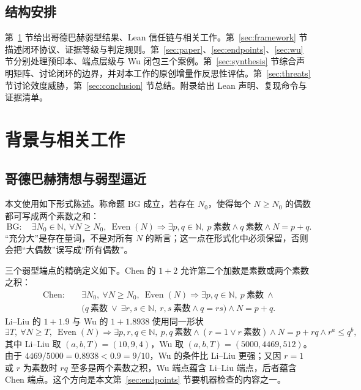 \documentclass[11pt,a4paper]{ctexart}
\theoremstyle{plain}
\theoremstyle{definition}
\newcommand{\BG}{\mathrm{BG}}
\newcommand{\Chen}{\mathrm{Chen}}
\newcommand{\Even}{\operatorname{Even}}
\newcommand{\N}{\mathbb{N}}
\begin{document}
\subsection{结构安排}
\label{sec:organization}

第~\ref{sec:background} 节给出哥德巴赫弱型结果、Lean 信任链与相关工作。第~\ref{sec:framework} 节描述闭环协议、证据等级与判定规则。第~\ref{sec:paper}、\ref{sec:endpoints}、\ref{sec:wu} 节分别处理预印本、端点层级与 Wu 闭包三个案例。第~\ref{sec:synthesis} 节综合声明矩阵、讨论闭环的边界，并对本工作的原创增量作反思性评估。第~\ref{sec:threats} 节讨论效度威胁，第~\ref{sec:conclusion} 节总结。附录给出 Lean 声明、复现命令与证据清单。

\section{背景与相关工作}
\label{sec:background}

\subsection{哥德巴赫猜想与弱型逼近}
\label{sec:bg}

本文使用如下形式陈述。称命题 $\BG$ 成立，若存在 $N_0$，使得每个 $N\ge N_0$ 的偶数都可写成两个素数之和：
\begin{equation}
\BG:\quad \exists N_0\in\N,\ \forall N\ge N_0,\ \Even(N)\Longrightarrow
\exists p,q\in\N,\ p\ \text{素数}\land q\ \text{素数}\land N=p+q.
\label{eq:bg}
\end{equation}
“充分大”是存在量词，不是对所有 $N$ 的断言；这一点在形式化中必须保留，否则会把“大偶数”误写成“所有偶数”。

三个弱型端点的精确定义如下。Chen 的 $1+2$ 允许第二个加数是素数或两个素数之积：
\begin{equation}
\begin{aligned}
\Chen:\quad &\exists N_0,\ \forall N\ge N_0,\ \Even(N)\Longrightarrow
\exists p,q\in\N,\ p\ \text{素数}\ \land\\
&\bigl(q\ \text{素数}\ \lor\ \exists r,s\in\N,\ r,s\ \text{素数}\land q=rs\bigr)
\land N=p+q.
\end{aligned}
\label{eq:chen}
\end{equation}
Li--Liu 的 $1+1.9$ 与 Wu 的 $1+1.8938$ 使用同一形状
\begin{equation}
\exists T,\ \forall N\ge T,\ \Even(N)\Longrightarrow
\exists p,r,q\in\N,\ p,q\ \text{素数}\land (r=1\lor r\ \text{素数})
\land N=p+rq\land r^{a}\le q^{b},
\label{eq:family}
\end{equation}
其中 Li--Liu 取 $(a,b,T)=(10,9,4)$，Wu 取 $(a,b,T)=(5000,4469,512)$\cite{liliu,upstream}。由于 $4469/5000=0.8938<0.9=9/10$，Wu 的条件比 Li--Liu 更强；又因 $r=1$ 或 $r$ 为素数时 $rq$ 至多是两个素数之积，Wu 端点蕴含 Li--Liu 端点，后者蕴含 Chen 端点。这个方向是本文第~\ref{sec:endpoints} 节要机器检查的内容之一。
\end{document}
